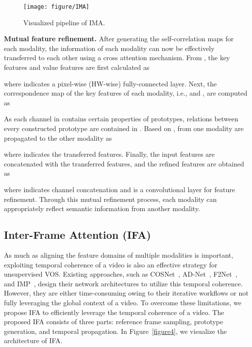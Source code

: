 \documentclass[10pt,twocolumn,letterpaper]{article}
\begin{document}
\begin{figure}[t]
\centering
\texttt{[image: figure/IMA]}
\caption{Visualized pipeline of IMA.}
\label{figure3}
\end{figure}




\vspace{1mm}
\noindent\textbf{Mutual feature refinement.} After generating the self-correlation maps for each modality, the information of each modality can now be effectively transferred to each other using a cross attention mechanism. From , the key features  and value features  are first calculated as

where  indicates a pixel-wise (HW-wise) fully-connected layer. Next, the correspondence map  of the key features of each modality, i.e.,  and , are computed as

As each channel in  contains certain properties of prototypes, relations between every constructed prototype are contained in . Based on ,  from one modality are propagated to the other modality as

where  indicates the transferred features. Finally, the input features are concatenated with the transferred features, and the refined features  are obtained as

where  indicates channel concatenation and  is a convolutional layer for feature refinement. Through this mutual refinement process, each modality can appropriately reflect semantic information from another modality.




\subsection{Inter-Frame Attention (IFA)}
As much as aligning the feature domains of multiple modalities is important, exploiting temporal coherence of a video is also an effective strategy for unsupervised VOS. Existing approaches, such as COSNet~\cite{COSNet}, AD-Net~\cite{AD-Net}, F2Net~\cite{F2Net}, and IMP~\cite{IMP}, design their network architectures to utilize this temporal coherence. However, they are either time-consuming owing to their iterative workflows or not fully leveraging the global context of a video. To overcome these limitations, we propose IFA to efficiently leverage the temporal coherence of a video. The proposed IFA consists of three parts: reference frame sampling, prototype generation, and temporal propagation. In Figure~\ref{figure4}, we visualize the architecture of IFA.
\end{document}
